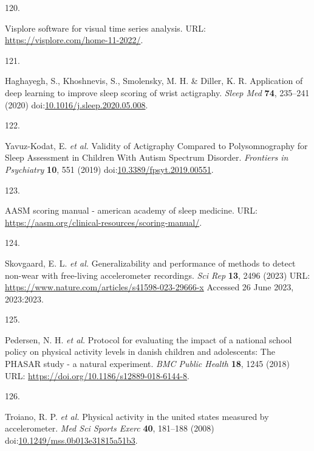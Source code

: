 \documentclass[
  10pt,
]{scrbook}
\newlength{\cslhangindent}
\newlength{\csllabelwidth}
\newlength{\cslentryspacingunit} %
\newenvironment{CSLReferences}[2] %
 {%
  \setlength{\parindent}{0pt}
  \ifodd #1
  \let\oldpar\par
  \def\par{\hangindent=\cslhangindent\oldpar}
  \fi
  \setlength{\parskip}{#2\cslentryspacingunit}
 }%
 {}
\newcommand{\CSLLeftMargin}[1]{\parbox[t]{\csllabelwidth}{#1}}
\newcommand{\CSLRightInline}[1]{\parbox[t]{\linewidth - \csllabelwidth}{#1}\break}
\begin{document}
\begin{CSLReferences}{0}{0}
\leavevmode{}%
\CSLLeftMargin{120. }%
\CSLRightInline{Visplore {\textendash} software for visual time series
analysis. URL: \url{https://visplore.com/home-11-2022/}.}

\leavevmode{}%
\CSLLeftMargin{121. }%
\CSLRightInline{Haghayegh, S., Khoshnevis, S., Smolensky, M. H. \&
Diller, K. R. Application of deep learning to improve sleep scoring of
wrist actigraphy. \emph{Sleep Med} \textbf{74}, 235--241 (2020)
doi:\href{https://doi.org/10.1016/j.sleep.2020.05.008}{10.1016/j.sleep.2020.05.008}.}

\leavevmode{}%
\CSLLeftMargin{122. }%
\CSLRightInline{Yavuz-Kodat, E. \emph{et al.} Validity of Actigraphy
Compared to Polysomnography for Sleep Assessment in Children With Autism
Spectrum Disorder. \emph{Frontiers in Psychiatry} \textbf{10}, 551
(2019)
doi:\href{https://doi.org/10.3389/fpsyt.2019.00551}{10.3389/fpsyt.2019.00551}.}

\leavevmode{}%
\CSLLeftMargin{123. }%
\CSLRightInline{AASM scoring manual - american academy of sleep
medicine. URL:
\url{https://aasm.org/clinical-resources/scoring-manual/}.}

\leavevmode{}%
\CSLLeftMargin{124. }%
\CSLRightInline{Skovgaard, E. L. \emph{et al.} Generalizability and
performance of methods to detect non-wear with free-living accelerometer
recordings. \emph{Sci Rep} \textbf{13}, 2496 (2023) URL:
\url{https://www.nature.com/articles/s41598-023-29666-x} Accessed 26
June 2023, 2023:2023.}

\leavevmode{}%
\CSLLeftMargin{125. }%
\CSLRightInline{Pedersen, N. H. \emph{et al.} Protocol for evaluating
the impact of a national school policy on physical activity levels in
danish children and adolescents: The PHASAR study - a natural
experiment. \emph{BMC Public Health} \textbf{18}, 1245 (2018) URL:
\url{https://doi.org/10.1186/s12889-018-6144-8}.}

\leavevmode{}%
\CSLLeftMargin{126. }%
\CSLRightInline{Troiano, R. P. \emph{et al.} Physical activity in the
united states measured by accelerometer. \emph{Med Sci Sports Exerc}
\textbf{40}, 181--188 (2008)
doi:\href{https://doi.org/10.1249/mss.0b013e31815a51b3}{10.1249/mss.0b013e31815a51b3}.}


\end{CSLReferences}
\end{document}
